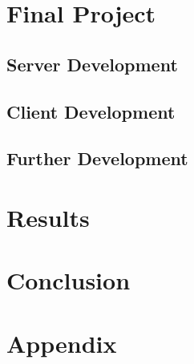 \documentclass[onecolumn, 12pt]{IEEEConf}
\begin{document}

    \section{Final Project}

    \subsection{Server Development}



    \subsection{Client Development}


    \subsection{Further Development}


    \section{Results}


    \section{Conclusion}


    \section{Appendix}

    
    
\end{document}
